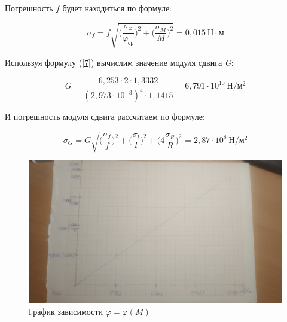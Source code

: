 \documentclass[12pt,a4paper]{article}
\begin{document}
Погрешность $\textit{f}$ будет находиться по формуле:

\[\sigma_{\textit{f}} = \textit{f}\sqrt{\Big(\frac{\sigma_{\varphi}}{\varphi_{\text{ср}}}\Big)^2 + \Big(\frac{\sigma_{M}}{M}\Big)^2} = 0,015 \: \text{Н} \cdot \text{м}\]

Используя формулу (\ref{7}) вычислим значение модуля сдвига \textit{G}:

\[\textit{G} = \frac{6,253 \cdot 2 \cdot 1,3332}{(2,973 \cdot 10^{-3})^4 \cdot 1,1415} = 6,791 \cdot 10^{10} \: \text{Н}/\text{м}^2\]

И погрешность модуля сдвига рассчитаем по формуле:

\[\sigma_{\textit{G}} = \textit{G}\sqrt{\Big(\frac{\sigma_{\textit{f}}}{\textit{f}}\Big)^2 + \Big(\frac{\sigma_{\textit{l}}}{\textit{l}}\Big)^2 + \Big(4\frac{\sigma_{\textit{R}}}{\textit{R}}\Big)^2} = 2,87 \cdot 10^8 \: \text{Н}/\text{м}^2\]

\begin{figure}[h!]
\centering
\includegraphics[scale=0.1]{Image2.png}
\caption{График зависимости $\varphi = \varphi(\textit{M})$}
\label{fig:Image1}
\end{figure}
\end{document}
